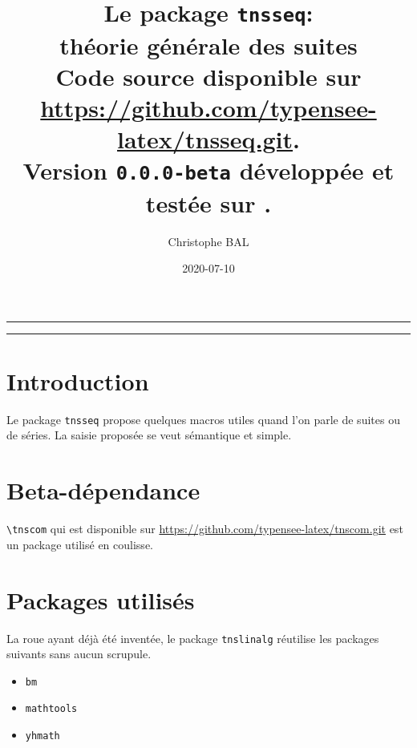 \documentclass[12pt,a4paper]{article}
\theoremstyle{definition}
\begin{document}
\renewcommand\labelitemi{\raisebox{0.125em}{\tiny\textbullet}}
\renewcommand{\labelitemii}{---}

\title{  %
	Le package \texttt{tnsseq}:\\%
	théorie générale des suites\\%
	{\footnotesize Code source disponible sur \url{https://github.com/typensee-latex/tnsseq.git}.}\\%
{\footnotesize Version \texttt{0.0.0-beta} développée et testée sur \macosxname{}.}%
}
\author{Christophe BAL}
\date{2020-07-10}

\maketitle


\vspace{2em}

\hrule

\tableofcontents

\vspace{1.5em}

\hrule

\newpage

\section{Introduction}

Le package \verb+tnsseq+ propose quelques macros utiles quand l'on parle de suites ou de séries. La saisie proposée se veut sémantique et simple.


\section{Beta-dépendance}

\verb#\tnscom# qui est disponible sur \url{https://github.com/typensee-latex/tnscom.git} est un package utilisé en coulisse.
\section{Packages utilisés}

La roue ayant déjà été inventée, le package \verb#tnslinalg# réutilise les packages suivants sans aucun scrupule.

\begin{multicols}{4}
    \begin{itemize}
        \item \verb#bm#
        \item \verb#mathtools#
        \item \verb#yhmath#
    \end{itemize}
\end{multicols}
\end{document}
